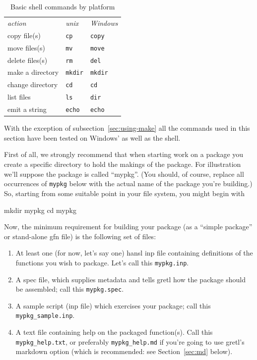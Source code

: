 \documentclass[oneside]{book}
\begin{document}
\begin{table}[htbp]
\centering
\begin{tabular}{lll}
\textit{action} & \textit{unix} & \textit{Windows} \\[4pt]
copy file(s) & \texttt{cp} & \texttt{copy} \\
move files(s) & \texttt{mv} & \texttt{move} \\
delete files(s) & \texttt{rm} & \texttt{del} \\
make a directory & \texttt{mkdir} & \texttt{mkdir} \\
change directory & \texttt{cd} & \texttt{cd} \\
list files & \texttt{ls} & \texttt{dir} \\
emit a string & \texttt{echo} & \texttt{echo}
\end{tabular}
\caption{Basic shell commands by platform}
\label{tab:basics}
\end{table}

With the exception of subsection~\ref{sec:using-make} all the commands
used in this section have been tested on Windows'  as
well as the  shell.

First of all, we strongly recommend that when starting work on a
package you create a specific directory to hold the makings of the
package. For illustration we'll suppose the package is called
``mypkg''. (You should, of course, replace all occurrences of
\texttt{mypkg} below with the actual name of the package you're
building.) So, starting from some suitable point in your file system,
you might begin with
%
\begin{code}
mkdir mypkg
cd mypkg
\end{code}

Now, the minimum requirement for building your package (as a ``simple
package'' or stand-alone \textsf{gfn} file) is the following set of
files:
\begin{enumerate}
\item At least one (for now, let's say one) hansl \textsf{inp} file
  containing definitions of the functions you wish to package. Let's
  call this \texttt{mypkg.inp}.
\item A \textsf{spec} file, which supplies metadata and tells gretl how the
  package should be assembled; call this \texttt{mypkg.spec}.
\item A sample script (\textsf{inp} file) which exercises your
  package; call this \texttt{mypkg\_sample.inp}.
\item A text file containing help on the packaged function(s). Call
  this \texttt{mypkg\_help.txt}, or preferably \texttt{mypkg\_help.md}
  if you're going to use gretl's markdown option (which is
  recommended: see Section~\ref{sec:md} below).
\end{enumerate}
\end{document}

